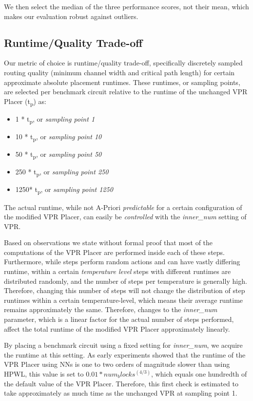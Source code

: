 We then select the median of the three performance scores, not their mean, which makes our evaluation robust against outliers.

\subsection{Runtime/Quality Trade-off}

Our metric of choice is runtime/quality trade-off, specifically discretely sampled routing quality (minimum channel width and critical path length) for certain approximate absolute placement runtimes. These runtimes, or sampling points, are selected per benchmark circuit relative to the runtime of the unchanged \gls{VPR} Placer (t\textsubscript{p}) as:

\begin{itemize}
	\item 1   * t\textsubscript{p}, or \textit{sampling point 1}
	\item 10  * t\textsubscript{p}, or \textit{sampling point 10}
	\item 50  * t\textsubscript{p}, or \textit{sampling point 50}
	\item 250 * t\textsubscript{p}, or \textit{sampling point 250}
	\item 1250* t\textsubscript{p}, or \textit{sampling point 1250}
\end{itemize}

The actual runtime, while not A-Priori \textit{predictable} for a certain configuration of the modified \gls{VPR} Placer, can easily be \textit{controlled} with the \textit{inner\_num} setting of \gls{VPR}.\cite{vtr8} 

Based on observations we state without formal proof that most of the computations of the \gls{VPR} Placer are performed inside each of these steps. Furthermore, while steps perform random actions and can have vastly differing runtime, within a certain \textit{temperature level} steps with different runtimes are distributed randomly, and the number of steps per temperature is generally high. Therefore, changing this number of steps will not change the distribution of step runtimes within a certain temperature-level, which means their average runtime remains approximately the same. Therefore, changes to the \textit{inner\_num} parameter, which is a linear factor for the actual number of steps performed, affect the total runtime of the modified \gls{VPR} Placer approximately linearly.

By placing a benchmark circuit using a fixed setting for \textit{inner\_num}, we acquire the runtime at this setting. As early experiments showed that the runtime of the \gls{VPR} Placer using \glspl{NN} is one to two orders of magnitude slower than using \gls{HPWL}, this value is set to $0.01*num_blocks^(4/3)$, which equals one hundredth of the default value of the \gls{VPR} Placer. Therefore, this first check is estimated to take approximately as much time as the unchanged \gls{VPR} at sampling point 1.

